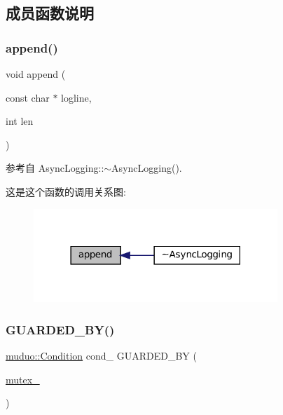 \subsection{成员函数说明}
\mbox{\label{classmuduo_1_1AsyncLogging_a14dd7b692df8633d1e5053d3499a24d3}} 
\subsubsection{\texorpdfstring{append()}{append()}}
{\footnotesize\ttfamily void append (\begin{DoxyParamCaption}\item[{const char $\ast$}]{logline,  }\item[{int}]{len }\end{DoxyParamCaption})}



参考自 Async\+Logging\+::$\sim$\+Async\+Logging().

这是这个函数的调用关系图\+:
\nopagebreak
\begin{figure}[H]
\begin{center}
\leavevmode
\includegraphics[width=261pt]{classmuduo_1_1AsyncLogging_a14dd7b692df8633d1e5053d3499a24d3_icgraph}
\end{center}
\end{figure}
\mbox{\label{classmuduo_1_1AsyncLogging_a7694d2aa52febdbd279ce6207c536326}} 
\subsubsection{\texorpdfstring{G\+U\+A\+R\+D\+E\+D\+\_\+\+B\+Y()}{GUARDED\_BY()}\hspace{0.1cm}{\footnotesize\ttfamily [1/4]}}
{\footnotesize\ttfamily \hyperlink{classmuduo_1_1Condition}{muduo\+::\+Condition} cond\+\_\+ G\+U\+A\+R\+D\+E\+D\+\_\+\+BY (\begin{DoxyParamCaption}\item[{\hyperlink{classmuduo_1_1AsyncLogging_ab9ed43ba5a78211f8947e85d98e1dffb}{mutex\+\_\+}}]{ }\end{DoxyParamCaption})\hspace{0.3cm}{\ttfamily [private]}}

